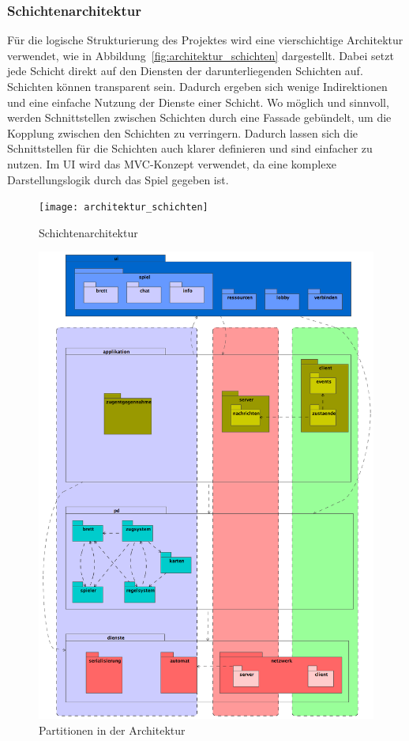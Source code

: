 \documentclass[12pt,halfparskip]{scrartcl}
\begin{document}
\subsubsection{Schichtenarchitektur} %
\label{sub:schichtenarchitektur}
Für die logische Strukturierung des Projektes wird eine vierschichtige Architektur verwendet, wie in Abbildung~\vref{fig:architektur_schichten} dargestellt. Dabei setzt jede Schicht direkt auf den Diensten der darunterliegenden Schichten auf. Schichten können transparent sein. Dadurch ergeben sich wenige Indirektionen und eine einfache Nutzung der Dienste einer Schicht. Wo möglich und sinnvoll, werden Schnittstellen zwischen Schichten durch eine Fassade gebündelt, um die Kopplung zwischen den Schichten zu verringern. Dadurch lassen sich die Schnittstellen für die Schichten auch klarer definieren und sind einfacher zu nutzen. Im UI wird das MVC-Konzept verwendet, da eine komplexe Darstellungslogik durch das Spiel gegeben ist.
\begin{figure}
	\centering
	\texttt{[image: architektur\_schichten]}
	\caption{Schichtenarchitektur}
	\label{fig:architektur_schichten}
\end{figure}
\clearpage
\begin{figure}
	\centering
	\includegraphics[width=\textwidth]{architektur_partitions}
	\caption{Partitionen in der Architektur}
	\label{fig:architektur_partitions}
\end{figure}
\end{document}
